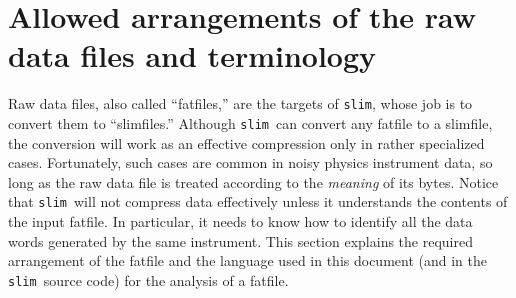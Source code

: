\documentclass[11pt]{article}
\newcommand{\slim}{{\tt slim}}
\begin{document}
\section{Allowed arrangements of the raw data files and terminology}
\label{sec:rawfiles}

Raw data files, also called ``fatfiles,'' are the targets of \slim,
whose job is to convert them to ``slimfiles.''  Although \slim\ can
convert any fatfile to a slimfile, the conversion will work as an
effective compression only in rather specialized cases.  Fortunately,
such cases are common in noisy physics instrument data, so long as the
raw data file is treated according to the \emph{meaning} of its bytes.
Notice that \slim\ will not compress data effectively unless it
understands the contents of the input fatfile.  In particular, it
needs to know how to identify all the data words generated by the same
instrument.  This section explains the required arrangement of the
fatfile and the language used in this document (and in the \slim\
source code) for the analysis of a fatfile.
\end{document}
